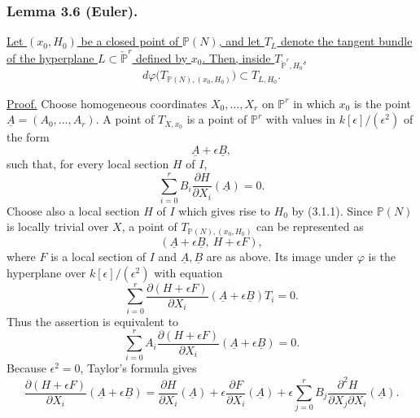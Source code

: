 \subsubsection*{Lemma 3.6 (Euler).}
\underline{Let $(x_0,H_0)$ be a closed point of $\mathbb P(N)$, and
let $T_L$ denote the tangent bundle of the hyperplane
$L\subset\check{\mathbb P}^{r}$ defined by $x_0$.  Then, inside
$T_{\check{\mathbb P}^{r},H_0}$,}
\[
d\varphi\bigl(T_{\mathbb P(N),(x_0,H_0)}\bigr)
\subset T_{L,H_0}.
\]

\noindent\underline{Proof.}
Choose homogeneous coordinates $X_0,\ldots,X_r$ on $\mathbb P^r$ in
which $x_0$ is the point
$\underline A=(A_0,\ldots,A_r)$.  A point of $T_{X,x_0}$ is a point
of $\mathbb P^r$ with values in $k[\epsilon]/(\epsilon^2)$ of the
form
\begin{equation}\tag{3.6.1}
\underline A+\epsilon\underline B,
\end{equation}
such that, for every local section $H$ of $I$,
\begin{equation}\tag{3.6.2}
\sum_{i=0}^{r}B_i\frac{\partial H}{\partial X_i}(\underline A)=0.
\end{equation}
Choose also a local section $H$ of $I$ which gives rise to $H_0$ by
(3.1.1).  Since $\mathbb P(N)$ is locally trivial over $X$, a point
of $T_{\mathbb P(N),(x_0,H_0)}$ can be represented as
\begin{equation}\tag{3.6.3}
(\underline A+\epsilon\underline B,\ H+\epsilon F),
\end{equation}
where $F$ is a local section of $I$ and $\underline A,\underline B$
are as above.  Its image under $\varphi$ is the hyperplane over
$k[\epsilon]/(\epsilon^2)$ with equation
\begin{equation}\tag{3.6.4}
\sum_{i=0}^{r}
\frac{\partial(H+\epsilon F)}{\partial X_i}
(\underline A+\epsilon\underline B)T_i=0.
\end{equation}
Thus the assertion is equivalent to
\begin{equation}\tag{3.6.5}
\sum_{i=0}^{r}A_i
\frac{\partial(H+\epsilon F)}{\partial X_i}
(\underline A+\epsilon\underline B)=0.
\end{equation}
Because $\epsilon^2=0$, Taylor's formula gives
\begin{equation}\tag{3.6.6}
\frac{\partial(H+\epsilon F)}{\partial X_i}
(\underline A+\epsilon\underline B)
=\frac{\partial H}{\partial X_i}(\underline A)
+\epsilon\frac{\partial F}{\partial X_i}(\underline A)
+\epsilon\sum_{j=0}^{r}B_j
\frac{\partial^2H}{\partial X_j\partial X_i}(\underline A).
\end{equation}
